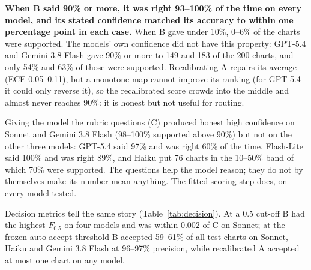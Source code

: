 \documentclass[10pt,letterpaper]{article}
\begin{document}
\textbf{When B said 90\% or more, it was right 93--100\% of the time on every model, and its stated confidence matched its accuracy to within one percentage point in each case.} When B gave under 10\%, 0--6\% of the charts were supported. The models' own confidence did not have this property: GPT-5.4 and Gemini 3.8 Flash gave 90\% or more to 149 and 183 of the 200 charts, and only 54\% and 63\% of those were supported. Recalibrating A repairs its average (ECE 0.05--0.11), but a monotone map cannot improve its ranking (for GPT-5.4 it could only reverse it), so the recalibrated score crowds into the middle and almost never reaches 90\%: it is honest but not useful for routing.

Giving the model the rubric questions (C) produced honest high confidence on Sonnet and Gemini 3.8 Flash (98--100\% supported above 90\%) but not on the other three models: GPT-5.4 said 97\% and was right 60\% of the time, Flash-Lite said 100\% and was right 89\%, and Haiku put 76 charts in the 10--50\% band of which 70\% were supported. The questions help the model reason; they do not by themselves make its number mean anything. The fitted scoring step does, on every model tested.

Decision metrics tell the same story (Table~\ref{tab:decision}). At a 0.5 cut-off B had the highest $F_{0.5}$ on four models and was within 0.002 of C on Sonnet; at the frozen auto-accept threshold B accepted 59--61\% of all test charts on Sonnet, Haiku and Gemini 3.8 Flash at 96--97\% precision, while recalibrated A accepted at most one chart on any model.
\end{document}
